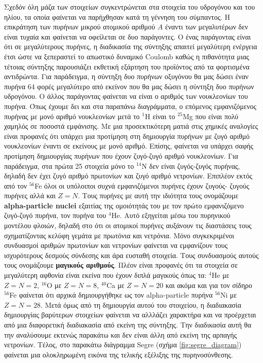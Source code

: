 Σχεδόν όλη μάζα των στοιχείων συγκεντρώνεται στα στοιχεία του υδρογόνου και του ηλίου, τα οποία φαίνεται να παρήχθησαν κατά τη γέννηση του σύμπαντος. Η επικράτηση των πυρήνων μικρού ατομικού αριθμού $A$ έναντι των μεγαλυτέρων δεν είναι τυχαία και φαίνεται να οφείλεται σε δυο παράγοντες. Ο ένας παράγοντας είναι ότι σε μεγαλύτερους πυρήνες, η διαδικασία της σύντηξης απαιτεί μεγαλύτερη ενέργεια έτσι ώστε να ξεπεραστεί το απωστικό δυναμικό Coulomb καθώς η πιθανότητα μιας τέτοιας σύντηξης παρουσιάζει εκθετική εξάρτηση του προϊόντος από τα φορτισμένα αντιδρώντα. Για παράδειγμα, η σύντηξη δυο πυρήνων οξυγόνου θα  μας δώσει έναν πυρήνα 64 φορές μεγαλύτερο από εκείνον που θα μας δώσει η σύντηξη δυο πυρήνων υδρογόνου. Ο άλλος παράγοντας φαίνεται να είναι ο αριθμός των νουκλεονίων του πυρήνα. Όπως έχουμε δει και στα παραπάνω διαγράμματα, ο επόμενος εμφανιζόμενος πυρήνας με μονό αριθμό νουκλεονίων μετά το $^{1}$H είναι το $^{25}$Mg που είναι πολύ χαμηλός σε ποσοστά εμφάνισης. Με μια προσεκτικότερη ματιά στις χημικές αναλογίες είναι προφανές ότι υπάρχει μια προτίμηση στη δημιουργία πυρήνων με ζυγό αριθμό νουκλεονίων έναντι σε εκείνους με μονό αριθμό. Επίσης, φαίνεται να υπάρχει σαφής προτίμηση δημιουργίας πυρήνων που έχουν ζυγό-ζυγό αριθμό νουκλεονίων. Για παράδειγμα, στα πρώτα 25 στοιχεία μόνο το $^{14}$N δεν είναι ζυγός-ζυγός πυρήνας, δηλαδή δεν έχει ζυγό αριθμό πρωτονίων και ζυγό αριθμό νετρονίων. Επιπλέον εκτός από τον $^{56}$Fe όλοι οι υπόλοιποι συχνά εμφανιζόμενοι πυρήνες έχουν ζυγούς- ζυγούς πυρήνες αλλά και $Z=N$. Τους πυρήνες με αυτή την ιδιότητα τους ονομάζουμε \textbf{alpha-particle nuclei} εξαιτίας της ομοιότητάς του με τον πρώτο εμφανιζόμενο ζυγό-ζυγό πυρήνα, τον πυρήνα του $^{4}$He. Αυτό εξηγείται μέσω του πυρηνικού μοντέλου φλοιών, δηλαδή στο ότι οι ατομικοί πυρήνες αυξάνουν τις διαστάσεις τους σχηματίζοντας κελύφη γεμάτα με πρωτόνια και νετρόνια. Μόνο συγκεκριμένοι συνδυασμοί αριθμών πρωτονίων και νετρονίων φαίνεται να εμφανίζουν τους ισχυρότερους δεσμούς σύνδεσης και άρα ευσταθή στοιχεία. Τους συνδυασμούς αυτούς τους ονομάζουμε \textbf{μαγικούς αριθμούς}. Πλέον είναι προφανές ότι τα στοιχεία σε μεγαλύτερη αφθονία είναι εκείνα που έχουν διπλά μαγικούς όπως τα: $^{4}$He με $Z = N = 2$, $^{16}$O με $Z = N = 8$, $^{40}$Ca με $Z = N = 20$ και ακόμα και για τον σίδηρο $^{56}$Fe φαίνεται ότι αρχικά δημιουργήθηκε ως τον alpha-particle πυρήνα $^{56}$Ni με $Z = N = 28$. Μετά όμως από τη δημιουργία αυτού του στοιχείου, η διαδιακασία δημιουργίας βαρύτερων στοιχείων φαίνεται να αλλλάζει χαρακτήρα και να προέρχεται από μια διαφορετική διαδιακασία από εκείνη της σύντηξης. Την διαδικασία αυτή θα την αναλύσουμε εκτενώς παρακάτω και δεν είναι άλλη από εκείνη της αρπαγής νετρονίων. Τέλος, στο παρακάτω διάγραμμα Segre (σχήμα \ref{fig:segre_diagram}) φαίνεται μια ολοκληρωμένη εικόνα της τελικής εξέλιξης της πυρηνοσύνθεσης.

